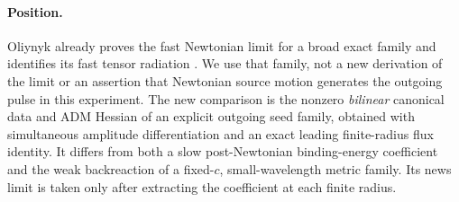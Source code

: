 \documentclass[11pt]{article}
\theoremstyle{remark}
\begin{document}
\paragraph{Position.}
Oliynyk already proves the fast Newtonian limit for a broad exact family and identifies its fast tensor radiation \cite[Prop.~4.1, Thm.~1.1]{Oliynyk}. We use that family, not a new derivation of the limit or an assertion that Newtonian source motion generates the outgoing pulse in this experiment. The new comparison is the nonzero \emph{bilinear} canonical data and ADM Hessian of an explicit outgoing seed family, obtained with simultaneous amplitude differentiation and an exact leading finite-radius flux identity. It differs from both a slow post-Newtonian binding-energy coefficient and the weak backreaction of a fixed-\(c\), small-wavelength metric family. Its news limit is taken only after extracting the coefficient at each finite radius.





\end{document}
